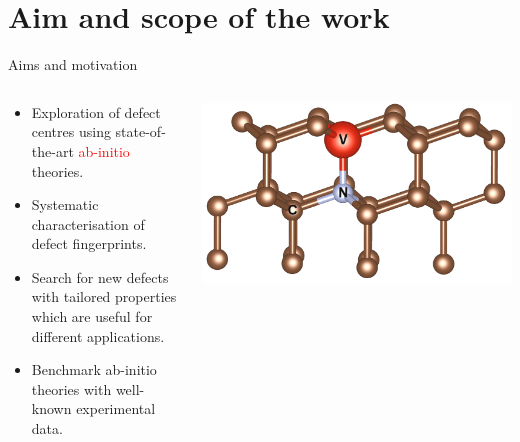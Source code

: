 \documentclass[notes=hide]{beamer}
\begin{document}
\section{Aim and scope of the work} %
\begin{frame}{Aims and motivation}

  \begin{columns}
    \begin{column}{0.5\textwidth}
      \begin{itemize}

        \item
          Exploration of defect centres using state-of-the-art \textcolor{red}{ab-initio}
          theories.

        \item
          Systematic characterisation of defect fingerprints.

        \item
          Search for new defects with tailored properties which are useful
          for different applications.

        \item
          Benchmark ab-initio theories with well-known
          experimental data.


      \end{itemize}
    \end{column}
    \begin{column}{0.5\textwidth}
      \begin{center}
        \includegraphics[width=1\textwidth]{images/POSCAR_16_view.png}
      \end{center}
    \end{column}
  \end{columns}


\end{frame}
\end{document}
